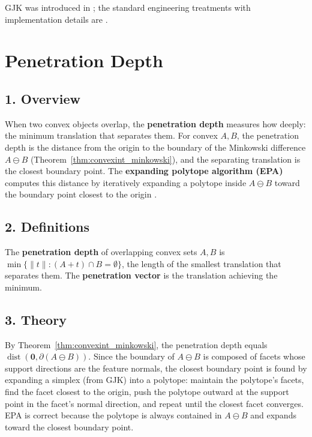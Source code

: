 GJK was introduced in \cite{gilbert1988}; the standard engineering
treatments with implementation details are \cite{ericson2004,vandenbergen2004}.

\section{Penetration Depth}
\label{sec:convexint_penetration_depth}

\subsection{1. Overview}

When two convex objects overlap, the \textbf{penetration depth} measures how
deeply: the minimum translation that separates them. For convex $A, B$, the
penetration depth is the distance from the origin to the boundary of the
Minkowski difference $A \ominus B$ (Theorem~\ref{thm:convexint_minkowski}),
and the separating translation is the closest boundary point. The
\textbf{expanding polytope algorithm (EPA)}
computes this distance by iteratively expanding a polytope inside
$A \ominus B$ toward the boundary point closest to the origin
\cite{vandenbergen2004}.

\subsection{2. Definitions}

\begin{definition}\label{def:convexint_penetration_depth}
  The \textbf{penetration depth} of overlapping convex sets $A, B$ is
  $\min\{ \|t\| : (A + t) \cap B = \emptyset \}$, the length of the
  smallest translation that separates them. The \textbf{penetration
  vector} is the translation achieving the minimum.
\end{definition}

\subsection{3. Theory}

By Theorem~\ref{thm:convexint_minkowski}, the penetration depth equals
$\operatorname{dist}(\mathbf{0}, \partial(A \ominus B))$. Since the
boundary of $A \ominus B$ is composed of facets whose support directions are
the feature normals, the closest boundary point is found by expanding a
simplex (from GJK) into a polytope: maintain the polytope's facets, find
the facet closest to the origin, push the polytope outward at the support
point in the facet's normal direction, and repeat until the closest facet
converges. EPA is correct because the polytope is always contained in
$A \ominus B$ and expands toward the closest boundary point.

